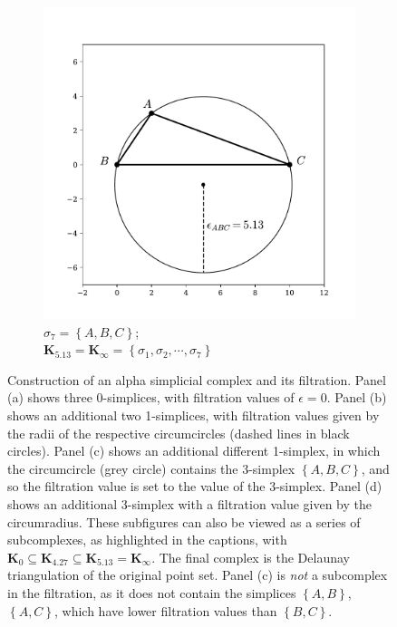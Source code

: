 \begin{figure}[tb]
\begin{subfigure}[b]{0.45\textwidth}
         \includegraphics[width=\textwidth]{./figures/ph/alpha_c.pdf}
         \caption{$\sigma_7=\left\{A,B,C\right\}$; \\ $\mathbf{K}_{5.13}=\mathbf{K}_{\infty} = \left\{\sigma_1,\sigma_2,\cdots,\sigma_7\right\}$}
         \label{fig:phalphac}
     \end{subfigure}
     \hfill
    
	\caption{Construction of an alpha simplicial complex and its filtration. Panel (a) shows three 0\--simplices, with filtration values of $\epsilon=0$. Panel (b) shows an additional two 1\--simplices, with filtration values given by the radii of the respective circumcircles (dashed lines in black circles). Panel (c) shows an additional different 1\--simplex, in which the circumcircle (grey circle) contains the 3\--simplex $\left\{A,B,C\right\}$, and so the filtration value is set to the value of the 3\--simplex. Panel (d) shows an additional 3\--simplex with a filtration value given by the circumradius.
	These subfigures can also be viewed as a series of subcomplexes, as highlighted in the captions, with $\mathbf{K}_0\subseteq\mathbf{K}_{4.27}\subseteq\mathbf{K}_{5.13}=\mathbf{K}_\infty$. The final complex is the Delaunay triangulation of the original point set. Panel (c) is \textit{not} a subcomplex in the filtration, as it does not contain the simplices $\left\{A,B\right\}$, $\left\{A,C\right\}$, which have lower filtration values than $\left\{B,C\right\}$.}
	\label{fig:phalpha}
\end{figure}


